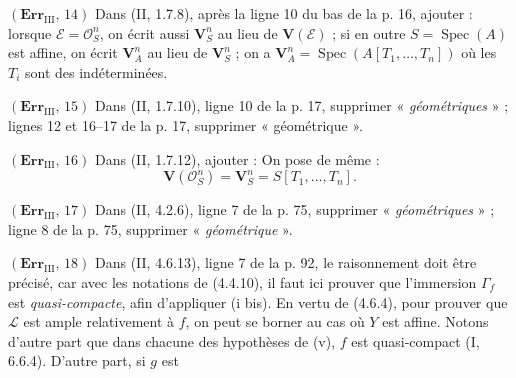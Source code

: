 \noindent\textbf{$(\mathbf{Err}_{\mathrm{III}},\,14)$} Dans (II, 1.7.8),
après la ligne 10 du bas de la p. 16, ajouter : lorsque
$\mathscr E=\mathscr O_S^n$, on écrit aussi $\mathbf V_S^n$ au lieu de
$\mathbf V(\mathscr E)$ ; si en outre $S=\operatorname{Spec}(A)$ est affine,
on écrit $\mathbf V_A^n$ au lieu de $\mathbf V_S^n$ ; on a
$\mathbf V_A^n=\operatorname{Spec}(A[T_1,\ldots,T_n])$ où les $T_i$ sont des
indéterminées.

\noindent\textbf{$(\mathbf{Err}_{\mathrm{III}},\,15)$} Dans (II, 1.7.10),
ligne 10 de la p. 17, supprimer « \emph{géométriques} » ; lignes 12 et 16--17
de la p. 17, supprimer « géométrique ».

\noindent\textbf{$(\mathbf{Err}_{\mathrm{III}},\,16)$} Dans (II, 1.7.12),
ajouter : On pose de même :
\[
  \mathbf V(\mathscr O_S^n)=\mathbf V_S^n=S[T_1,\ldots,T_n].
\]

\noindent\textbf{$(\mathbf{Err}_{\mathrm{III}},\,17)$} Dans (II, 4.2.6),
ligne 7 de la p. 75, supprimer « \emph{géométriques} » ; ligne 8 de la p.
75, supprimer « \emph{géométrique} ».

\noindent\textbf{$(\mathbf{Err}_{\mathrm{III}},\,18)$} Dans (II, 4.6.13),
ligne 7 de la p. 92, le raisonnement doit être précisé, car avec les notations
de (4.4.10), il faut ici prouver que l'immersion $\Gamma_f$ est
\emph{quasi-compacte}, afin d'appliquer (i bis). En vertu de (4.6.4), pour
prouver que $\mathscr L$ est ample relativement à $f$, on peut se borner au
cas où $Y$ est affine. Notons d'autre part que dans chacune des hypothèses de
(v), $f$ est quasi-compact (I, 6.6.4). D'autre part, si $g$ est
